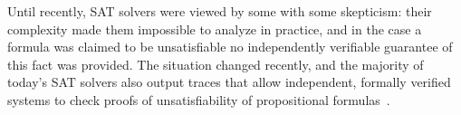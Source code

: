 Until recently, SAT solvers were viewed by some with some skepticism: their
complexity made them impossible to analyze in practice, and in the case a
formula was claimed to be unsatisfiable no independently verifiable guarantee of
this fact was provided. The situation changed recently, and the majority of
today's SAT solvers also output traces that allow independent, formally verified
systems to check proofs of unsatisfiability of propositional formulas~\cite{lcfEtAl2017b,lcfEtAl2017c}.
